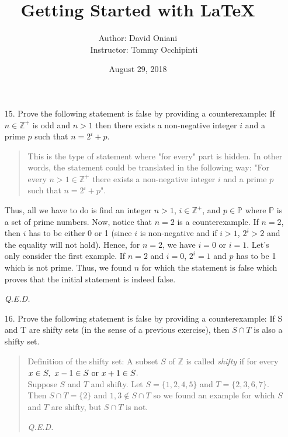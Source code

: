 \documentclass[12pt, a4paper]{article}             %
\title{\bf{Getting Started with \LaTeX}}
\author{Author: David Oniani
\\
\ \ \ Instructor: Tommy Occhipinti}
\date{August 29, 2018}
\begin{document}
\maketitle


\begin{enumerate}
\item[15.]
Prove the following statement is false by providing a counterexample: If $n \in \mathbb{Z}^+$ is odd
and $n > 1$ then there exists a non-negative integer $i$ and a prime $p$ such that $n = 2^i + p$.
\\

\begin{quote}
This is the type of statement where "for every" part is hidden. In other words,
the statement could be translated in the following way: "For every $n > 1 \in \mathbb{Z}^+$
there exists a non-negative integer $i$ and a prime $p$ such that
$n = 2^i + p$".
\end{quote}

Thus, all we have to do is find an integer $n > 1$, $i \in \mathbb{Z}^+$, and $p \in \mathbb{P}$ where $\mathbb{P}$ is a set
of prime numbers. Now, notice that $n = 2$ is a counterexample. If $n = 2$, then $i$ has to be either 0 or 1 (since $i$ is non-negative and
if $i > 1$, $2^i > 2$ and the equality will not hold).
Hence, for $n = 2$, we have $i = 0$ or $i = 1$. Let's only consider the first example.
If $n = 2$ and $i = 0$, $2^i = 1$ and $p$ has to be 1 which is not prime. Thus, we found $n$ for which the statement is false which
proves that the initial statement is indeed false.
\begin{flushright}
\textit{Q.E.D.}
\end{flushright}

\item[16.]
Prove the following statement is false by providing a counterexample:
If S and T are shifty sets (in the sense of a previous exercise), then $S \cap T$ is also a shifty set.
\begin{quote}
Definition of the shifty set: A subset $S$ of $\mathbb{Z}$ is called \textit{shifty} if for every $x \in S, \ x-1 \in S \ \textnormal{or} \ x + 1 \in S$.\\

Suppose $S$ and $T$ and shifty. Let $S = \{1,2,4,5\}$ and $T = \{2,3,6,7\}$.
Then $S \cap T = \{2\}$ and $1, 3 \notin S \cap T$ so we found an example for which
$S$ and $T$ are shifty, but $S \cap T$ is not.
\begin{flushright}
\textit{Q.E.D.}
\end{flushright}
\end{quote}


\end{enumerate}
\end{document}
